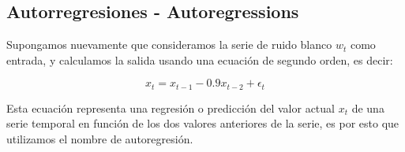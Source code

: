 


\subsection{Autorregresiones - Autoregressions}
Supongamos nuevamente que consideramos la serie de ruido blanco $w_t$ como entrada, y calculamos la salida usando una ecuaci\'on de segundo orden, es decir:

\begin{equation*}
x_t = x_{t-1} - 0.9 x_{t-2} + \epsilon_t
\end{equation*}

Esta ecuaci\'on representa una regresi\'on o predicci\'on del valor actual $x_t$ de una serie temporal en funci\'on de los dos valores anteriores de la serie, es por esto que utilizamos el nombre de autoregresi\'on.



